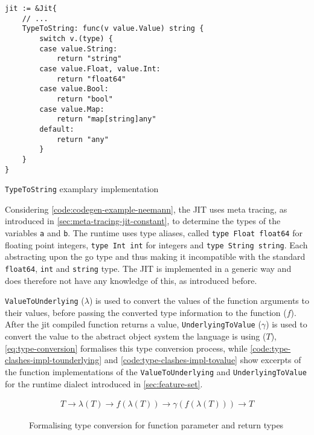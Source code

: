 \begin{listing}[H]
    \begin{verbatim}
jit := &Jit{
    // ...
    TypeToString: func(v value.Value) string {
        switch v.(type) {
        case value.String:
            return "string"
        case value.Float, value.Int:
            return "float64"
        case value.Bool:
            return "bool"
        case value.Map:
            return "map[string]any"
        default:
            return "any"
        }
    }
}
    \end{verbatim}
    \caption{\texttt{TypeToString} examplary implementation}
    \label{code:type-clashes-impl-typetostring}
\end{listing}

Considering \autoref{code:codegen-example-neemann}, the JIT uses meta tracing,
as introduced in \autoref{sec:meta-tracing-jit-constant}, to determine the
types of the variables \texttt{a} and \texttt{b}. The runtime uses type
aliases, called \texttt{type Float float64} for floating point
integers, \texttt{type Int int} for integers and 
\texttt{type String string}. Each abstracting upon the go type and thus making it
incompatible with the standard \texttt{float64}, \texttt{int}
and \texttt{string} type. The JIT is implemented in a generic way and
does therefore not have any knowledge of this, as introduced before.

\texttt{ValueToUnderlying} ($\lambda$) is used to convert the values of the
function arguments to their values, before passing the converted type
information to the function ($f$). After the jit compiled function returns a
value, \texttt{UnderlyingToValue} ($\gamma$) is used to convert the value to
the abstract object system the language is using ($T$),
\autoref{eq:type-conversion} formalises this type conversion process, while
\autoref{code:type-clashes-impl-tounderlying} and
\autoref{code:type-clashes-impl-tovalue} show excerpts of the function
implementations of the \texttt{ValueToUnderlying} and
\texttt{UnderlyingToValue} for the runtime dialect introduced in
\autoref{sec:feature-set}.

\begin{figure}[H]
    \begin{eqnarray}
T \rightarrow \lambda(T) \rightarrow f(\lambda(T)) \rightarrow \gamma(f(\lambda(T))) \rightarrow T
    \end{eqnarray}
    \caption{Formalising type conversion for function parameter and return types}
    \label{eq:type-conversion}
\end{figure}

